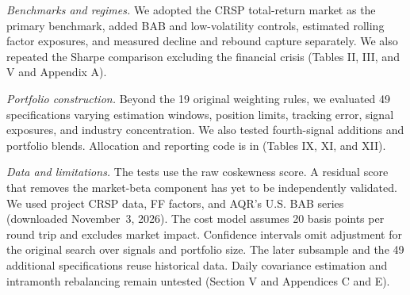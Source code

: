 \documentclass[11pt,a4paper]{article}
\begin{document}
\textit{Benchmarks and regimes.} We adopted the CRSP total-return market as the primary benchmark, added BAB and low-volatility controls, estimated rolling factor exposures, and measured decline and rebound capture separately. We also repeated the Sharpe comparison excluding the financial crisis (Tables II, III, and V and Appendix A).

\textit{Portfolio construction.} Beyond the 19 original weighting rules, we evaluated 49 specifications varying estimation windows, position limits, tracking error, signal exposures, and industry concentration. We also tested fourth-signal additions and portfolio blends. Allocation and reporting code is in  (Tables IX, XI, and XII).

\textit{Data and limitations.} The tests use the raw coskewness score. A residual score that removes the market-beta component has yet to be independently validated. We used project CRSP data, FF factors, and AQR's U.S. BAB series (downloaded November~3, 2026). The cost model assumes 20 basis points per round trip and excludes market impact. Confidence intervals omit adjustment for the original search over signals and portfolio size. The later subsample and the 49 additional specifications reuse historical data. Daily covariance estimation and intramonth rebalancing remain untested (Section V and Appendices C and E).
\end{document}
